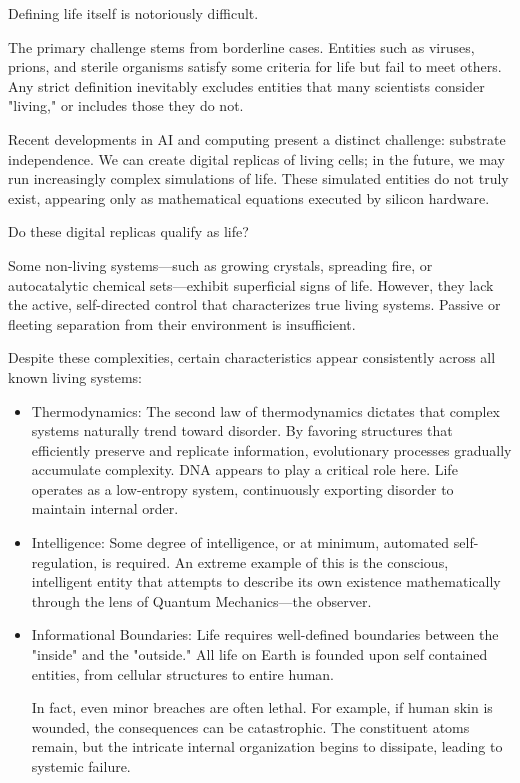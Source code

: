 Defining life itself is notoriously difficult.

The primary challenge stems from borderline cases.
Entities such as viruses, prions, and sterile organisms satisfy some criteria for life but fail to meet others.
Any strict definition inevitably excludes entities that many scientists consider "living," or includes those they do not.

Recent developments in AI and computing present a distinct challenge: substrate independence.
We can create digital replicas of living cells; in the future, we may run increasingly complex simulations of life.
These simulated entities do not truly exist, appearing only as mathematical equations executed by silicon hardware.

Do these digital replicas qualify as life?

Some non-living systems—such as growing crystals, spreading fire, or autocatalytic chemical sets—exhibit superficial signs of life.
However, they lack the active, self-directed control that characterizes true living systems.
Passive or fleeting separation from their environment is insufficient.

Despite these complexities, certain characteristics appear consistently across all known living systems:

\begin{itemize}

\item Thermodynamics: The second law of thermodynamics dictates that complex systems naturally trend toward disorder.
  By favoring structures that efficiently preserve and replicate information, evolutionary processes gradually accumulate complexity.
  DNA appears to play a critical role here. Life operates as a low-entropy system, continuously exporting disorder to maintain internal order.

\item Intelligence: Some degree of intelligence, or at minimum, automated self-regulation, is required.
  An extreme example of this is the conscious, intelligent entity that attempts to describe its own existence mathematically through the lens of Quantum Mechanics—the observer. 

\item Informational Boundaries: Life requires well-defined boundaries between the "inside" and the "outside." All life on Earth is founded upon self contained entities, from cellular structures to entire human.

  In fact, even minor breaches are often lethal. For example, if human skin is wounded, the consequences can be catastrophic.
  The constituent atoms remain, but the intricate internal organization begins to dissipate, leading to systemic failure.
\end{itemize}


